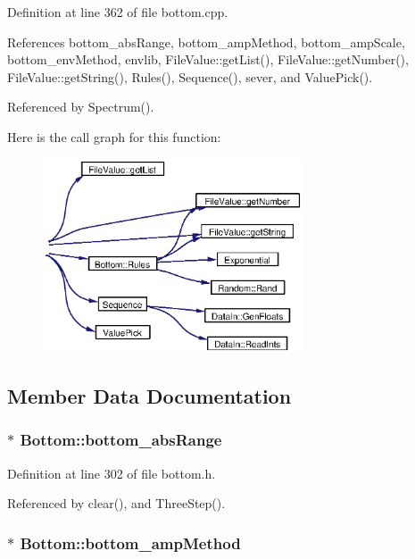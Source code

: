 Definition at line 362 of file bottom.cpp.

References bottom\_\-abs\-Range, bottom\_\-amp\-Method, bottom\_\-amp\-Scale, bottom\_\-env\-Method, envlib, File\-Value::get\-List(), File\-Value::get\-Number(), File\-Value::get\-String(), Rules(), Sequence(), sever, and Value\-Pick().

Referenced by Spectrum().

Here is the call graph for this function:\begin{figure}[H]
\begin{center}
\leavevmode
\includegraphics[width=218pt]{classBottom_a20_cgraph}
\end{center}
\end{figure}


\subsection{Member Data Documentation}
\subsubsection{$\ast$ {\bf Bottom::bottom\_\-abs\-Range}}\label{classBottom_o4}




Definition at line 302 of file bottom.h.

Referenced by clear(), and Three\-Step().
\subsubsection{$\ast$ {\bf Bottom::bottom\_\-amp\-Method}}\label{classBottom_o9}




